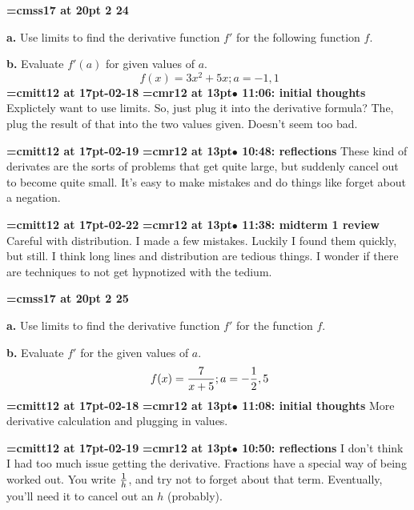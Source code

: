 {\medskip\noindent\bf\font\titlefont=cmss17 at 20pt 2 24}\medskip
\par {\bf a.} Use limits to find the derivative function $f'$ for
the following function $f$.
\par {\bf b.} Evaluate $f'(a)$ for given values of $a$.
$$\
f(x) = 3x^2 + 5x; a=-1, 1
$$
{\medskip\noindent\bf\font\titlefont=cmitt12 at 17pt-02-18}\medskip
{\smallskip\noindent\bf\font\titlefont=cmr12 at 13pt\titlefont $\bullet$ 11:06: initial thoughts}\smallskip
Explictely want to use limits. So, just plug it into the derivative formula? The, plug the result of that into the two values given. Doesn't seem too bad.
\par

{\medskip\noindent\bf\font\titlefont=cmitt12 at 17pt-02-19}\medskip
{\smallskip\noindent\bf\font\titlefont=cmr12 at 13pt\titlefont $\bullet$ 10:48: reflections}\smallskip
These kind of derivates are the sorts of problems that get quite large, but suddenly cancel out to become quite small. It's easy to make mistakes and do things like forget about a negation.
\par

{\medskip\noindent\bf\font\titlefont=cmitt12 at 17pt-02-22}\medskip
{\smallskip\noindent\bf\font\titlefont=cmr12 at 13pt\titlefont $\bullet$ 11:38: midterm 1 review}\smallskip
Careful with distribution. I made a few mistakes. Luckily I found them quickly, but still. I think long lines and distribution are tedious things. I wonder if there are techniques to not get hypnotized with the tedium.
\par

{\medskip\noindent\bf\font\titlefont=cmss17 at 20pt 2 25}\medskip
\par {\bf a.} Use limits to find the derivative function $f'$
for the function $f$.
\par {\bf b.} Evaluate $f'$ for the given values of $a$.
$$\
f(x) = {7 \over x + 5}; a = -{1 \over 2}, 5
$$
{\medskip\noindent\bf\font\titlefont=cmitt12 at 17pt-02-18}\medskip
{\smallskip\noindent\bf\font\titlefont=cmr12 at 13pt\titlefont $\bullet$ 11:08: initial thoughts}\smallskip
More derivative calculation and plugging in values.
\par

{\medskip\noindent\bf\font\titlefont=cmitt12 at 17pt-02-19}\medskip
{\smallskip\noindent\bf\font\titlefont=cmr12 at 13pt\titlefont $\bullet$ 10:50: reflections}\smallskip
I don't think I had too much issue getting the derivative. Fractions have a special way of being worked out. You write $1 \over h$, and try not to forget about that term. Eventually, you'll need it to cancel out an $h$ (probably).
\par

